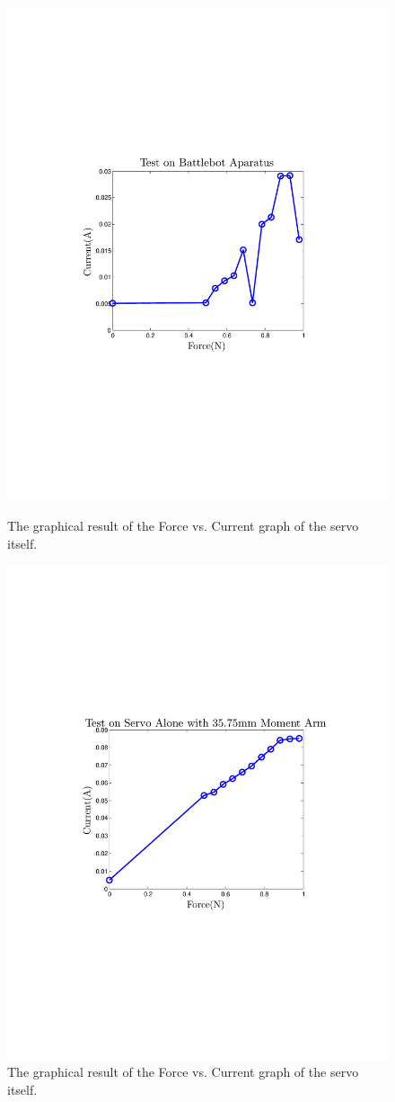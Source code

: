 \documentclass[12pt,onecolumn]{report}
\begin{document}
\begin{figure}[ht]
\begin{minipage}[b]{0.45\linewidth}
\centering
\includegraphics[width=.45\linewidth]{./Figs/Test_on_Battlebot_Aparatus.pdf}
\caption{The graphical result of the Force vs. Current graph of the servo itself.}
\label{fig:BB Test}
\end{minipage}
\hspace{0.5cm}
\begin{minipage}[b]{0.45\linewidth}
\centering
\includegraphics[width=0.45\linewidth]{./Figs/Test_on_servo.pdf}
\caption{The graphical result of the Force vs. Current graph of the servo itself.}
\label{fig:Servo Test}
\end{minipage}
\end{figure}
\end{document}
